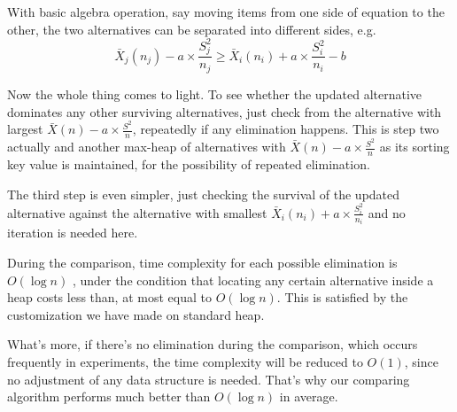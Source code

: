 With basic algebra operation, say moving items from one side of equation to the other, the two alternatives can be separated into different sides, e.g.
$$ \bar{X}_j(n_j) - a \times \frac{S_j^2}{n_j} \ge \bar{X}_i(n_i) + a \times \frac{S_i^2}{n_i} - b $$

Now the whole thing comes to light. To see whether the updated alternative dominates any other surviving alternatives, just check from the alternative with largest $\bar{X}(n) - a \times \frac{S^2}{n}$, repeatedly if any elimination happens. This is step two actually and another max-heap of alternatives with $\bar{X}(n) - a \times \frac{S^2}{n}$ as its sorting key value is maintained, for the possibility of repeated elimination.

The third step is even simpler, just checking the survival of the updated alternative against the alternative with smallest $\bar{X}_i(n_i) + a \times \frac{S_i^2}{n_i}$ and no iteration is needed here.

During the comparison, time complexity for each possible elimination is $O(\log n)$ , under the condition that locating any certain alternative inside a heap costs less than, at most equal to $O(\log n)$. This is satisfied by the customization we have made on standard heap.

What's more, if there's no elimination during the comparison, which occurs frequently in experiments, the time complexity will be reduced to $O(1)$, since no adjustment of any data structure is needed. That's why our comparing algorithm performs much better than $O(\log n)$ in average.
